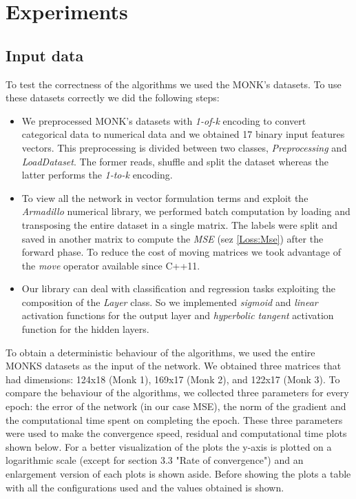 \section{Experiments}

\subsection{Input data}
To test the correctness of the algorithms we used the MONK's datasets. To use these datasets correctly we did the following steps:
\begin{itemize}
	\item We preprocessed MONK's datasets with \textit{1-of-k} encoding to convert categorical data to numerical data and we obtained 17 binary input features vectors. This preprocessing is divided between two classes, \textit{Preprocessing} and \textit{LoadDataset}. The former reads, shuffle and split the dataset whereas the latter performs the \textit{1-to-k} encoding. 
	\item To view all the network in vector formulation terms and exploit the \textit{Armadillo} numerical library, we performed batch computation by loading and transposing the entire dataset in a single matrix. The labels were split and saved in another matrix to compute the \textit{MSE} (sez \ref{Loss:Mse}) after the forward phase. To reduce the cost of moving matrices we took advantage of the \textit{move} operator available since C++11. 
	\item Our library can deal with classification and regression tasks exploiting the composition of the \textit{Layer} class.  So we implemented \textit{sigmoid} and \textit{linear} activation functions for the output layer and \textit{hyperbolic tangent} activation function for the hidden layers.
\end{itemize}



To obtain a deterministic behaviour of the algorithms, we used the entire MONKS datasets as the input of the network. We obtained three matrices that had dimensions: 124x18 (Monk 1), 169x17 (Monk 2), and 122x17 (Monk 3). To compare the behaviour of the algorithms, we collected three parameters for every epoch: the error of the network (in our case MSE), the norm of the gradient and the computational time spent on completing the epoch. These three parameters were used to make the convergence speed, residual and computational time plots shown below. For a better visualization of the plots the y-axis is plotted on a logarithmic scale (except for section 3.3 "Rate of convergence") and an enlargement version of each plots is shown aside. Before showing the plots a table with all the configurations used and the values obtained is shown.

